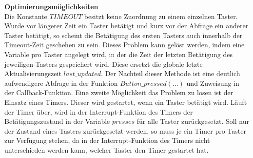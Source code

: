 \newline
\textbf{Optimierungsmöglichkeiten}\\
Die Konstante $TIMEOUT$ besitzt keine Zuordnung zu einem einzelnen Taster. Wurde vor längerer Zeit ein Taster betätigt und kurz vor der Abfrage ein anderer Taster betätigt, so scheint die Betätigung des ersten Tasters auch innerhalb der Timeout-Zeit geschehen zu sein. Dieses Problem kann gelöst werden, indem eine Variable pro Taster angelegt wird, in der die Zeit der letzten Betätigung des jeweiligen Tasters gespeichert wird. Diese ersetzt die globale letzte Aktualisierungszeit $last\_updated$. Der Nachteil dieser Methode ist eine deutlich aufwendigere Abfrage in der Funktion $Button\_pressed(...)$ und Zuweisung in der Callback-Funktion. Eine zweite Möglichkeit das Problem zu lösen ist der Einsatz eines Timers. Dieser wird gestartet, wenn ein Taster betätigt wird. Läuft der Timer über, wird in der Interrupt-Funktion des Timers der Betätigungszustand in der Variable $presses$ für alle Taster zurückgesetzt. Soll nur der Zustand eines Tasters zurückgesetzt werden, so muss je ein Timer pro Taster zur Verfügung stehen, da in der Interrupt-Funktion des Timers nicht unterschieden werden kann, welcher Taster den Timer gestartet hat.